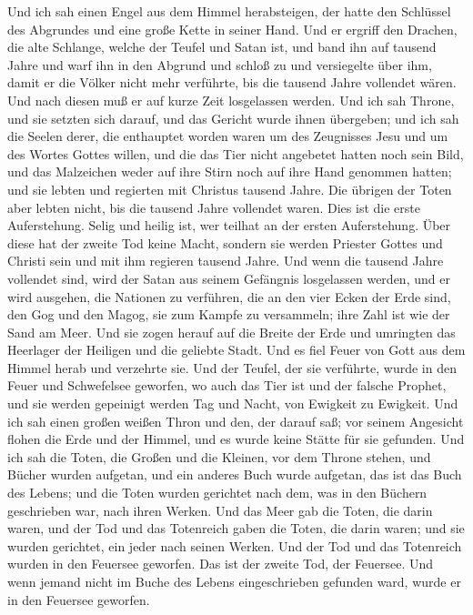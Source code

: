  Und ich sah einen Engel aus dem Himmel herabsteigen, der
hatte den Schlüssel des Abgrundes und eine große Kette in seiner Hand.
 Und er ergriff den Drachen, die alte Schlange, welche der
Teufel und Satan ist, und band ihn auf tausend Jahre  und
warf ihn in den Abgrund und schloß zu und versiegelte über ihm, damit er
die Völker nicht mehr verführte, bis die tausend Jahre vollendet wären.
Und nach diesen muß er auf kurze Zeit losgelassen werden. 
Und ich sah Throne, und sie setzten sich darauf, und das Gericht wurde
ihnen übergeben; und ich sah die Seelen derer, die enthauptet worden
waren um des Zeugnisses Jesu und um des Wortes Gottes willen, und die
das Tier nicht angebetet hatten noch sein Bild, und das Malzeichen weder
auf ihre Stirn noch auf ihre Hand genommen hatten; und sie lebten und
regierten mit Christus tausend Jahre.  Die übrigen der
Toten aber lebten nicht, bis die tausend Jahre vollendet waren. Dies ist
die erste Auferstehung.  Selig und heilig ist, wer teilhat
an der ersten Auferstehung. Über diese hat der zweite Tod keine Macht,
sondern sie werden Priester Gottes und Christi sein und mit ihm regieren
tausend Jahre.  Und wenn die tausend Jahre vollendet sind,
wird der Satan aus seinem Gefängnis losgelassen werden, 
und er wird ausgehen, die Nationen zu verführen, die an den vier Ecken
der Erde sind, den Gog und den Magog, sie zum Kampfe zu versammeln; ihre
Zahl ist wie der Sand am Meer.  Und sie zogen herauf auf
die Breite der Erde und umringten das Heerlager der Heiligen und die
geliebte Stadt. Und es fiel Feuer von Gott aus dem Himmel herab und
verzehrte sie.  Und der Teufel, der sie verführte, wurde
in den Feuer und Schwefelsee geworfen, wo auch das Tier ist und der
falsche Prophet, und sie werden gepeinigt werden Tag und Nacht, von
Ewigkeit zu Ewigkeit.  Und ich sah einen großen weißen
Thron und den, der darauf saß; vor seinem Angesicht flohen die Erde und
der Himmel, und es wurde keine Stätte für sie gefunden. 
Und ich sah die Toten, die Großen und die Kleinen, vor dem Throne
stehen, und Bücher wurden aufgetan, und ein anderes Buch wurde aufgetan,
das ist das Buch des Lebens; und die Toten wurden gerichtet nach dem,
was in den Büchern geschrieben war, nach ihren Werken. 
Und das Meer gab die Toten, die darin waren, und der Tod und das
Totenreich gaben die Toten, die darin waren; und sie wurden gerichtet,
ein jeder nach seinen Werken.  Und der Tod und das
Totenreich wurden in den Feuersee geworfen. Das ist der zweite Tod, der
Feuersee.  Und wenn jemand nicht im Buche des Lebens
eingeschrieben gefunden ward, wurde er in den Feuersee geworfen.

